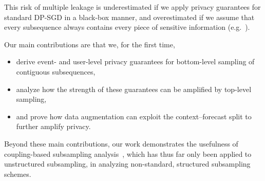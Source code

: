 This risk of multiple leakage is underestimated if we apply privacy guarantees for standard DP-SGD in a black-box manner, and overestimated if we assume that 
every subsequence always contains every piece of sensitive information (e.g.~\cite{arcolezi2022differentially}).

Our main contributions are that we, for the first time,
\begin{itemize}[noitemsep, nosep]
    \item derive event- and user-level privacy guarantees for bottom-level sampling of contiguous subsequences,
    \item analyze how the strength of these guarantees can be amplified by top-level sampling, 
    \item and prove how data augmentation can exploit the context--forecast split to further amplify privacy.
\end{itemize}
Beyond these main contributions, our work demonstrates the usefulness of coupling-based subsampling analysis~\cite{balle2018privacy,schuchardt2024unified}, which has thus far only been applied to unstructured subsampling, in analyzing non-standard, structured subsampling schemes.

